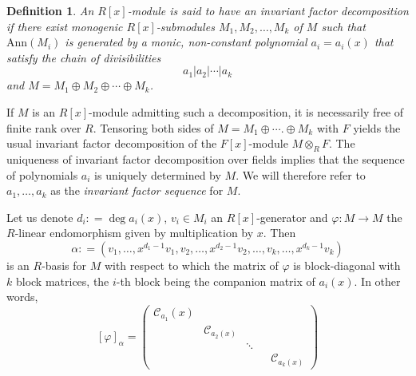 \documentclass[11pt]{article}
\newtheorem{definition}[theo]{Definition}
\theoremstyle{definition}
\numberwithin{equation}{section}
\begin{document}
\begin{definition} An $ R[x]$-module is  said to have an \textit{invariant factor decomposition} if there exist monogenic $ R[x]$-submodules   $ M_{1} ,  M_{2} ,  \ldots,  M_{k}   $ of $ M  $  such that  $ \mathrm{Ann}(M_{i}) $ is generated by a monic, non-constant polynomial $  a_{i} = a_{i}(x) $ that satisfy the chain of divisibilities $$  a_{1} |  a_{2}  |            \cdots  |  a_{k}       $$            
and  $  M    =   M_{1}     \oplus   M_{2}   \oplus    \cdots   \oplus      M_{k}            $. 
\end{definition} 

If  $ M $ is an $R[x]$-module admitting such a decomposition, it is necessarily free of finite rank over $ R $.   Tensoring  both  sides       of     $ M = M_{1} \oplus  \cdots. \oplus   M_{k} $ with $ F $ yields the usual invariant factor decomposition of the $ F[x] $-module $ M \otimes_{R} F $. The uniqueness of invariant factor decomposition over fields implies that the sequence  of   polynomials $ a_{i}  $ is uniquely determined by $ M  $. We will therefore  refer to $ a_{1}, \ldots, a_{k} $ as  the \emph{invariant factor sequence}  for $ M $.  
 
Let us denote  $    d_{i}  : =     \deg   a_{i}(x)  $, $ v_{i} \in M_i$ an $ R[x]$-generator and $ \varphi : M \to M $ the $ R $-linear endomorphism given by multiplication by $ x $. Then $$           \alpha            : =   ( v_{1} ,  \ldots,  x ^ { d_{1}    - 1 } v_{1} ,  v_{2}  , \ldots,   x ^{ d_{2} - 1}  v_{2} ,  \ldots ,   v_{k}  , \ldots ,         x ^ { d_{k} -1 } v_{k}  )   $$ is an $ R $-basis for $  M  $ with respect to which the matrix of $ \varphi $ is block-diagonal with $ k $ block matrices, the $  i $-th block being the companion matrix of $ a_{i}(x) $. In other words,                                                                   
\begin{equation} \label{xalpha}    [\varphi]_{\alpha}  = \begin{pmatrix}    \mathcal{C}_{a_{1}}(x)  &   &    &    \\ 
                                                                            &    \mathcal{C}_{a_{2}(x)} &    &      &       \\ 
                                                                                                                          &    &    \ddots    &  &      \\
                                                             &                       &                                      &  &        \mathcal{C}_{a_{k}(x)}      
\end{pmatrix} 
\end{equation}  
\end{document}
